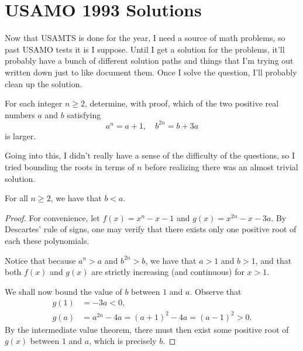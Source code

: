 \documentclass[a4paper, 10pt]{article}
\begin{document}
\section*{USAMO 1993 Solutions}

Now that USAMTS is done for the year, I need a source of math problems, so past
USAMO tests it is I suppose. Until I get a solution for the problems, it'll
probably have a bunch of different solution paths and things that I'm trying
out written down just to like document them. Once I solve the question, I'll probably clean up the solution.

\begin{chirpbox}
\begin{problemnum}
    For each integer \( n \ge 2 \), determine, with proof, which of the two positive real numbers \( a \) and \( b \) satisfying
    \[
        a^n = a + 1, \quad b^{2n} = b + 3a
    \]
    is larger.
\end{problemnum}
\end{chirpbox}

\begin{solution}
    Going into this, I didn't really have a sense of the difficulty of the
    questions, so I tried bounding the roots in terms of \( n \) before
    realizing there was an almost trivial solution.
    
    \begin{claim}
        For all \( n \ge 2 \), we have that \( b < a \).
    \end{claim}
    \begin{proof}
        For convenience, let \( f(x) = x^n - x - 1 \) and \( g(x) = x^{2n} - x
        - 3a \). By Descartes' rule of signs, one may verify that there exists
        only one positive root of each these polynomials.

        Notice that because \( a^n > a \) and \( b^{2n} > b \), we have that \(
        a > 1 \) and \( b > 1 \), and that both \( f(x) \) and \( g(x) \) are
        strictly increasing (and continuous) for \( x > 1 \).

        We shall now bound the value of \( b \) between \( 1 \) and \( a \). Observe that
        \begin{align*}
            g(1) &= -3a < 0, \\
            g(a) &= a^{2n} - 4a = (a + 1)^2 - 4a = (a-1)^2 > 0
        .\end{align*}
        By the intermediate value theorem, there must then exist some positive root of \( g(x) \) between \( 1 \) and \( a \), which is precisely \( b \).
    \end{proof}
\end{solution}
\end{document}
